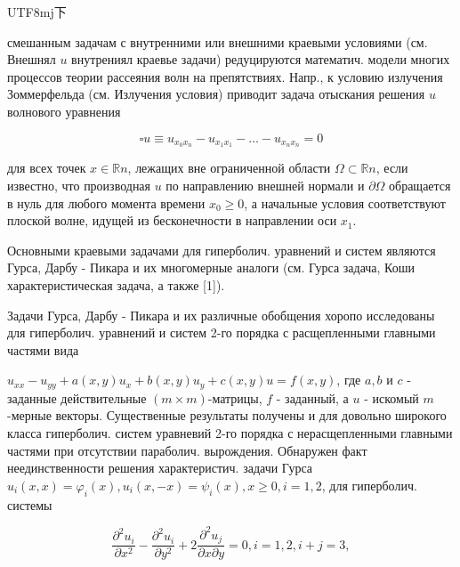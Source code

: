 \documentclass[10pt]{article}
\begin{document}
\begin{CJK}{UTF8}{mj}下\end{CJK} смешанным задачам с внутренними или внешними краевыми условиями (см. Внешнял $u$ внутрениял краевье задачи) редуцируются математич. модели многих процессов теории рассеяния волн на препятствиях. Напр., к условию излучения Зоммерфельда (см. Излучения условия) приводит задача отыскания решения $u$ волнового уравнения



\[

\square u \equiv u_{x_{0} x_{n}}-u_{x_{1} x_{1}}-\ldots-u_{x_{n} x_{n}}=0

\]



для всех точек $x \in \mathbb{R} n$, лежащих вне ограниченной области $\Omega \subset \mathbb{R} n$, если известно, что производная $u$ по направлению внешней нормали и $\partial \Omega$ обращается в нуль для любого момента времени $x_{0} \geqslant 0$, а начальные условия соответствуют плоской волне, идущей из бесконечности в направлении оси $x_{1}$.



Основными краевыми задачами для гиперболич. уравнений и систем являются Гурса, Дарбу - Пикара и их многомерные аналоги (см. Гурса задача, Коши характеристическая задача, а также [1]).



Задачи Гурса, Дарбу - Пикара и их различные обобщения хоропо исследованы для гиперболич. уравнений и систем 2-го порядка с расщепленными главными частями вида



$u_{x x}-u_{y y}+a(x, y) u_{x}+b(x, y) u_{y}+c(x, y) u=f(x, y)$, где $a, b$ и $c$ - заданные действительные $(m \times m)$-матрицы, $f$ - заданный, а $u$ - искомый $m$-мерные векторы. Существенные результаты получены и для довольно широкого класса гиперболич. систем уравневий 2-го порядка с нерасщепленными главными частями при отсутствии параболич. вырождения. Обнаружен факт неединственности решения характеристич. задачи Гурса $u_{i}(x, x)=\varphi_{i}(x), u_{i}(x,-x)=\psi_{i}(x), x \geqslant 0, i=1,2$, для гиперболич. системы



\[

\frac{\partial^{2} u_{i}}{\partial x^{2}}-\frac{\partial^{2} u_{i}}{\partial y^{2}}+2 \frac{\partial^{2} u_{j}}{\partial x \partial y}=0, i=1,2, i+j=3,

\]
\end{document}
